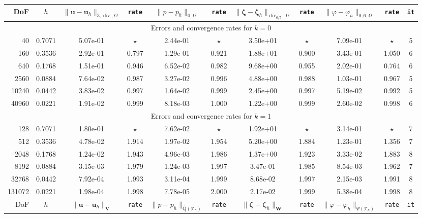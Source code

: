 \documentclass[11pt, reqno, a4paper, twoside]{article}
\newcommand{\bu}{\boldsymbol{u}}
\newcommand\bzeta{\boldsymbol{\zeta}}
\newcommand{\rQ}{\mathrm{Q}}
\newcommand{\bW}{\mathbf{W}}
\newcommand{\bV}{\mathbf{V}}
\newcommand{\cT}{\mathcal{T}}
\newcommand\vdiv{\mathop{\mathrm{div}}\nolimits}
\numberwithin{equation}{section}
\numberwithin{remark}{section}
\numberwithin{figure}{section}
\numberwithin{table}{section}
\begin{document}
\begin{table}[!t]
\setlength{\tabcolsep}{3pt}
\centering
{\footnotesize\begin{tabular}{|rcccccccccc|}
\hline
DoF  &    $h$ & $\|\bu-\bu_h\|_{3,\vdiv,\Omega}\!$  &  \texttt{rate} &  $\|p-p_h\|_{0,\Omega}$  &  \texttt{rate} & \(\|\bzeta-\bzeta_h\|_{\vdiv_{6/5},\Omega}\)& \texttt{rate} &\(\|\varphi-\varphi_h\|_{0,6,\Omega}\)&\texttt{rate} &  \texttt{it} \\
\hline
\multicolumn{11}{|c|}{Errors and convergence rates for $k = 0$}\\
\hline
       40 & 0.7071 & 5.07e-01 & $\star$ & 2.44e-01 & $\star$ & 3.50e+01 & $\star$ & 7.09e-01 & $\star$ & 5 \\
    160 & 0.3536 & 2.92e-01 & 0.797 & 1.29e-01 & 0.921 & 1.88e+01 & 0.900 & 3.43e-01 & 1.050 & 6\\
    640 & 0.1768 & 1.51e-01 & 0.946 & 6.52e-02 & 0.982 & 9.68e+00 & 0.955 & 2.02e-01 & 0.764 & 6\\
   2560 & 0.0884 & 7.64e-02 & 0.987 & 3.27e-02 & 0.996 & 4.88e+00 & 0.988 & 1.03e-01 & 0.967 & 5\\
  10240 & 0.0442 & 3.83e-02 & 0.997 & 1.64e-02 & 0.999 & 2.45e+00 & 0.997 & 5.19e-02 & 0.992 & 5\\
  40960 & 0.0221 & 1.91e-02 & 0.999 & 8.18e-03 & 1.000 & 1.22e+00 & 0.999 & 2.60e-02 & 0.998 & 6\\
\hline
\multicolumn{11}{|c|}{Errors and convergence rates for $k = 1$}\\
\hline
     128 & 0.7071 & 1.80e-01 &$\star$& 7.62e-02 & $\star$ & 1.92e+01 &$\star$  & 3.14e-01 & $\star$ & 7 \\
    512 & 0.3536 & 4.78e-02 & 1.914 & 1.97e-02 & 1.954 & 5.20e+00 & 1.884 & 1.23e-01 & 1.356 & 7\\
   2048 & 0.1768 & 1.24e-02 & 1.943 & 4.96e-03 & 1.986 & 1.37e+00 & 1.923 & 3.33e-02 & 1.883 & 8\\
   8192 & 0.0884 & 3.15e-03 & 1.979 & 1.24e-03 & 1.997 & 3.47e-01 & 1.985 & 8.54e-03 & 1.962 & 7\\
  32768 & 0.0442 & 7.92e-04 & 1.993 & 3.11e-04 & 1.999 & 8.68e-02 & 1.997 & 2.15e-03 & 1.991 & 8\\
 131072 & 0.0221 & 1.98e-04 & 1.998 & 7.78e-05 & 2.000 & 2.17e-02 & 1.999 & 5.38e-04 & 1.998 & 8\\
 \hline
 \hline
DoF  &    $h$ & $\|\bu-\bu_h\|_{\bV}\!$  &  \texttt{rate} &  $\|p-p_h\|_{\widehat{\rQ}(\cT_h)}$  &  \texttt{rate} & \(\|\bzeta-\bzeta_h\|_{\bW}\)& \texttt{rate} &\(\|\varphi-\varphi_h\|_{\widehat{\Psi}(\cT_h)}\)&\texttt{rate} &  \texttt{it} \\

\end{tabular}}
\end{table}
\end{document}
